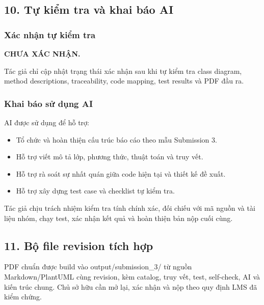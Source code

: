 \documentclass[11pt,a4paper]{article}
\providecommand{\tightlist}{%
  \setlength{\itemsep}{0pt}\setlength{\parskip}{0pt}}
\begin{document}
\hypertarget{tux1ef1-kiux1ec3m-tra-vuxe0-khai-buxe1o-ai}{%
\subsection{10. Tự kiểm tra và khai báo
AI}\label{tux1ef1-kiux1ec3m-tra-vuxe0-khai-buxe1o-ai}}

\hypertarget{xuxe1c-nhux1eadn-tux1ef1-kiux1ec3m-tra}{%
\subsubsection{Xác nhận tự kiểm
tra}\label{xuxe1c-nhux1eadn-tux1ef1-kiux1ec3m-tra}}

\textbf{CHƯA XÁC NHẬN.}

Tác giả chỉ cập nhật trạng thái xác nhận sau khi tự kiểm tra class
diagram, method descriptions, traceability, code mapping, test results
và PDF đầu ra.

\hypertarget{khai-buxe1o-sux1eed-dux1ee5ng-ai}{%
\subsubsection{Khai báo sử dụng
AI}\label{khai-buxe1o-sux1eed-dux1ee5ng-ai}}

AI được sử dụng để hỗ trợ:

\begin{itemize}
\tightlist
\item
  Tổ chức và hoàn thiện cấu trúc báo cáo theo mẫu Submission 3.
\item
  Hỗ trợ viết mô tả lớp, phương thức, thuật toán và truy vết.
\item
  Hỗ trợ rà soát sự nhất quán giữa code hiện tại và thiết kế đề xuất.
\item
  Hỗ trợ xây dựng test case và checklist tự kiểm tra.
\end{itemize}

Tác giả chịu trách nhiệm kiểm tra tính chính xác, đối chiếu với mã nguồn
và tài liệu nhóm, chạy test, xác nhận kết quả và hoàn thiện bản nộp cuối
cùng.

\hypertarget{bux1ed9-file-revision-tuxedch-hux1ee3p}{%
\subsection{11. Bộ file revision tích
hợp}\label{bux1ed9-file-revision-tuxedch-hux1ee3p}}

PDF chuẩn được build vào output/submission\_3/ từ nguồn
Markdown/PlantUML cùng revision, kèm catalog, truy vết, test,
self-check, AI và kiến trúc chung. Chủ sở hữu cần mở lại, xác nhận và
nộp theo quy định LMS đã kiểm chứng.
\end{document}

